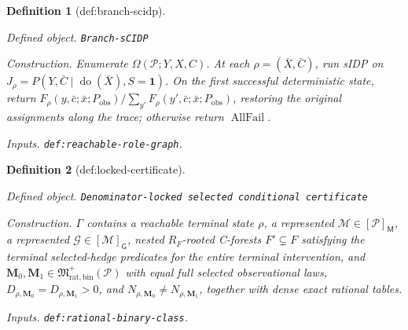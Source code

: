 \documentclass{article}
\newtheorem{definition}{Definition}
\begin{document}
\begin{definition}[def:branch-scidp]\label{def:branch-scidp}
\par\smallskip\noindent\emph{Defined object.} \texttt{Branch-\allowbreak{}sCIDP}
\par\smallskip\noindent\emph{Construction.} Enumerate \(\Omega(\mathcal P;Y,X,C)\). At each \(\rho=(\bar X,\bar C)\), run sIDP on \(J_{\rho}=P(Y,\bar C\mid\operatorname{do}(\bar X),S=\mathbf 1)\). On the first successful deterministic state, return \(F_{\rho}(y,\bar c;\bar x;P_{\mathrm{obs}})/\sum_{y'}F_{\rho}(y',\bar c;\bar x;P_{\mathrm{obs}})\), restoring the original assignments along the trace; otherwise return \(\operatorname{AllFail}\).
\par\smallskip\noindent\emph{Inputs.} \texttt{def:\allowbreak{}reachable-\allowbreak{}role-\allowbreak{}graph}.
\end{definition}

\begin{definition}[def:locked-certificate]\label{def:locked-certificate}
\par\smallskip\noindent\emph{Defined object.} \texttt{Denominator-\allowbreak{}locked selected conditional certificate}
\par\smallskip\noindent\emph{Construction.} \(\Gamma\) contains a reachable terminal state \(\rho\), a represented \(\mathcal M\in[\mathcal P]_{\mathsf M}\), a represented \(\mathcal G\in[\mathcal M]_{\mathsf G}\), nested \(R_F\)-rooted C-forests \(F'\subsetneq F\) satisfying the terminal selected-hedge predicates for the entire terminal intervention, and \(\mathbf M_0,\mathbf M_1\in\mathfrak M_{\mathrm{rat,bin}}^+(\mathcal P)\) with equal full selected observational laws, \(D_{\rho,\mathbf M_0}=D_{\rho,\mathbf M_1}>0\), and \(N_{\rho,\mathbf M_0}\neq N_{\rho,\mathbf M_1}\), together with dense exact rational tables.
\par\smallskip\noindent\emph{Inputs.} \texttt{def:\allowbreak{}rational-\allowbreak{}binary-\allowbreak{}class}.
\end{definition}
\end{document}
